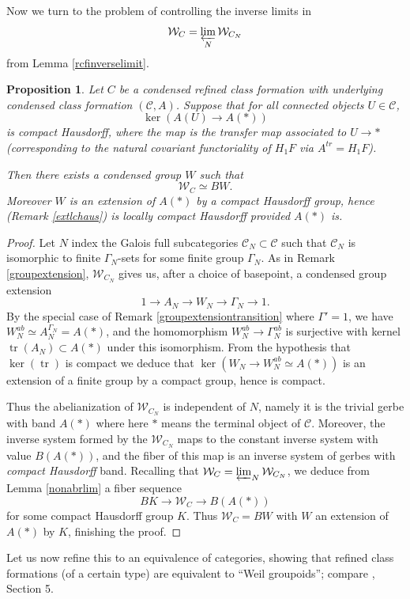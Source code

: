 \documentclass[12pt]{article}
\newtheorem{proposition}[theorem]{Proposition}
\theoremstyle{definition}
\newcommand{\on}{\operatorname}
\newcommand{\mc}{\mathcal}
\begin{document}
Now we turn to the problem of controlling the inverse limits in 
$$\mc{W}_C = \varprojlim_N \mc{W}_{C_N}$$
from Lemma \ref{rcfinverselimit}.

\begin{proposition}\label{groupoidisgroup}
Let $C$ be a condensed refined class formation with underlying condensed class formation $(\mc{C},A)$.  Suppose that
for all connected objects $U\in\mc{C}$,
$$\on{ker}(A(U) \to A(\ast))$$
is compact Hausdorff, where the map is the transfer map associated to $U\to \ast$ (corresponding to the natural covariant functoriality of $H_1F$ via $A^{tr}=H_1F$).

Then there exists a condensed group $W$ such that
$$\mc{W}_C\simeq BW.$$
Moreover $W$ is an extension of $A(\ast)$ by a compact Hausdorff group, hence (Remark \ref{extlchaus}) is locally compact Hausdorff provided $A(\ast)$ is.
\end{proposition}

\begin{proof}
Let $N$ index the Galois full subcategories $\mc{C}_N\subset\mc{C}$ such that $\mc{C}_N$ is isomorphic to finite $\Gamma_N$-sets for some finite group $\Gamma_N$.  As in Remark \ref{groupextension}, $\mc{W}_{C_N}$ gives us, after a choice of basepoint, a condensed group extension
$$1 \to A_N \to W_N \to \Gamma_N \to 1.$$
By the special case of Remark \ref{groupextensiontransition} where $\Gamma'=1$, we have $W_N^{ab}\simeq A_N^{\Gamma_N}=A(\ast)$, and the homomorphism $W_N^{ab}\to \Gamma_N^{ab}$ is surjective with kernel $\on{tr}(A_N)\subset A(\ast)$ under this isomorphism.  From the hypothesis that $\on{ker}(\on{tr})$ is compact we deduce that $\on{ker}(W_N\to W_N^{ab}\simeq A(\ast))$ is an extension of a finite group by a compact group, hence is compact.

Thus the abelianization of $\mc{W}_{C_N}$ is independent of $N$, namely it is the trivial gerbe with band $A(\ast)$ where here $\ast$ means the terminal object of $\mc{C}$.  Moreover, the inverse system formed by the $\mc{W}_{C_N}$ maps to the constant inverse system with value $B(A(\ast))$, and the fiber of this map is an inverse system of gerbes with \emph{compact Hausdorff} band.  Recalling that $\mc{W}_C=\varprojlim_N\mc{W}_{C_N}$, we deduce from Lemma \ref{nonabrlim} a fiber sequence
$$BK \to \mc{W}_C \to B(A(\ast))$$
for some compact Hausdorff group $K$.  Thus $\mc{W}_C=BW$ with $W$ an extension of $A(\ast)$ by $K$, finishing the proof.
\end{proof}


Let us now refine this to an equivalence of categories, showing that refined class formations (of a certain type) are equivalent to ``Weil groupoids''; compare \cite{tatentb}, \cite{dasgupta} Section 5.
\end{document}
